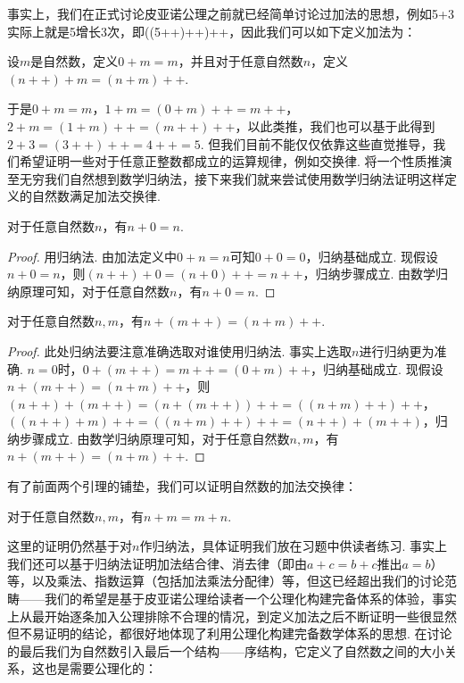 事实上，我们在正式讨论皮亚诺公理之前就已经简单讨论过加法的思想，例如5+3实际上就是5增长3次，即((5++)++)++，因此我们可以如下定义加法为：

\begin{definition*}
    设$m$是自然数，定义$0+m=m$，并且对于任意自然数$n$，定义$(n++)+m=(n+m)++$.
\end{definition*}

于是$0+m=m$，$1+m=(0+m)++=m++$，$2+m=(1+m)++=(m++)++$，以此类推，我们也可以基于此得到$2+3=(3++)++=4++=5$. 但我们目前不能仅仅依靠这些直觉推导，我们希望证明一些对于任意正整数都成立的运算规律，例如交换律. 将一个性质推演至无穷我们自然想到数学归纳法，接下来我们就来尝试使用数学归纳法证明这样定义的自然数满足加法交换律.

\begin{lemma*}
    对于任意自然数$n$，有$n+0=n$.
\end{lemma*}
\begin{proof}
    用归纳法. 由加法定义中$0+n=n$可知$0+0=0$，归纳基础成立. 现假设$n+0=n$，则$(n++)+0=(n+0)++=n++$，归纳步骤成立. 由数学归纳原理可知，对于任意自然数$n$，有$n+0=n$.
\end{proof}

\begin{lemma*}
    对于任意自然数$n,m$，有$n+(m++)=(n+m)++$.
\end{lemma*}
\begin{proof}
    此处归纳法要注意准确选取对谁使用归纳法. 事实上选取$n$进行归纳更为准确. $n=0$时，$0+(m++)=m++=(0+m)++$，归纳基础成立. 现假设$n+(m++)=(n+m)++$，则$(n++)+(m++)=(n+(m++))++=((n+m)++)++$，$((n++)+m)++=((n+m)++)++=(n++)+(m++)$，归纳步骤成立. 由数学归纳原理可知，对于任意自然数$n,m$，有$n+(m++)=(n+m)++$.
\end{proof}

有了前面两个引理的铺垫，我们可以证明自然数的加法交换律：

\begin{theorem*}
    对于任意自然数$n,m$，有$n+m=m+n$.
\end{theorem*}
这里的证明仍然基于对$n$作归纳法，具体证明我们放在习题中供读者练习. 事实上我们还可以基于归纳法证明加法结合律、消去律（即由$a+c=b+c$推出$a=b$）等，以及乘法、指数运算（包括加法乘法分配律）等，但这已经超出我们的讨论范畴——我们的希望是基于皮亚诺公理给读者一个公理化构建完备体系的体验，事实上从最开始逐条加入公理排除不合理的情况，到定义加法之后不断证明一些很显然但不易证明的结论，都很好地体现了利用公理化构建完备数学体系的思想. 在讨论的最后我们为自然数引入最后一个结构——序结构，它定义了自然数之间的大小关系，这也是需要公理化的：

